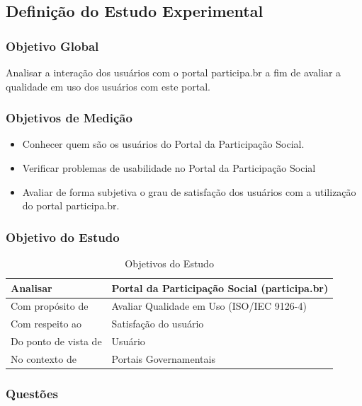 \subsection{Definição do Estudo Experimental}

\subsubsection{Objetivo Global}

	Analisar a interação dos usuários com o portal participa.br a fim de avaliar a qualidade em uso dos usuários com este portal. 

\subsubsection{Objetivos de Medição}

\begin{itemize}
\item Conhecer quem são os usuários do Portal da Participação Social.
\item Verificar problemas de usabilidade no Portal da Participação Social
\item Avaliar de forma subjetiva o grau de satisfação dos usuários com a utilização do portal participa.br. 
\end{itemize}


\subsubsection{Objetivo do Estudo}


\begin{table}[h]
\begin{tabular}{|l|l|}
\hline
Analisar             & Portal da Participação Social (participa.br) \\ \hline
Com propósito de     & Avaliar Qualidade em Uso (ISO/IEC 9126-4)    \\ \hline
Com respeito ao      & Satisfação do usuário                        \\ \hline
Do ponto de vista de & Usuário                                      \\ \hline
No contexto de       & Portais Governamentais                       \\ \hline
\end{tabular}
\caption {Objetivos do Estudo}
\end{table}

\subsubsection{Questões}

